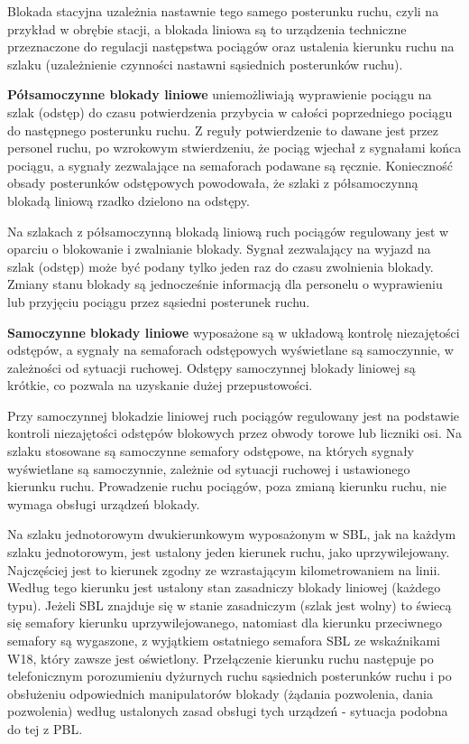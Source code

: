 Blokada stacyjna uzależnia nastawnie tego samego posterunku ruchu, czyli na przykład w obrębie stacji, a blokada liniowa są to urządzenia techniczne przeznaczone do regulacji następstwa pociągów oraz ustalenia kierunku ruchu na szlaku (uzależnienie czynności nastawni sąsiednich posterunków ruchu). 

\textbf{Półsamoczynne blokady liniowe} uniemożliwiają wyprawienie pociągu na szlak (odstęp) do czasu potwierdzenia przybycia w całości poprzedniego pociągu do następnego posterunku ruchu. Z reguły potwierdzenie to dawane jest przez personel ruchu, po wzrokowym stwierdzeniu, że pociąg wjechał z sygnałami końca pociągu, a sygnały zezwalające na semaforach podawane są ręcznie. Konieczność obsady posterunków odstępowych powodowała, że szlaki z półsamoczynną blokadą liniową rzadko dzielono na odstępy.

Na szlakach z półsamoczynną blokadą liniową ruch pociągów regulowany jest w oparciu o blokowanie i zwalnianie blokady. Sygnał zezwalający na wyjazd na szlak (odstęp) może być podany tylko jeden raz do czasu zwolnienia blokady. Zmiany stanu blokady są jednocześnie informacją dla personelu o wyprawieniu lub przyjęciu pociągu przez sąsiedni posterunek ruchu.

\textbf{Samoczynne blokady liniowe} wyposażone są w układową kontrolę niezajętości odstępów, a sygnały na semaforach odstępowych wyświetlane są samoczynnie, w zależności od sytuacji ruchowej. Odstępy samoczynnej blokady liniowej są krótkie, co pozwala na uzyskanie dużej przepustowości.

Przy samoczynnej blokadzie liniowej ruch pociągów regulowany jest na podstawie kontroli niezajętości odstępów blokowych przez obwody torowe lub liczniki osi. Na szlaku stosowane są samoczynne semafory odstępowe, na których sygnały wyświetlane są samoczynnie, zależnie od sytuacji ruchowej i ustawionego kierunku ruchu. Prowadzenie ruchu pociągów, poza zmianą kierunku ruchu, nie wymaga obsługi urządzeń blokady.

Na szlaku jednotorowym dwukierunkowym wyposażonym w SBL, jak na każdym szlaku jednotorowym, jest ustalony jeden kierunek ruchu, jako uprzywilejowany. Najczęściej jest to kierunek zgodny ze wzrastającym kilometrowaniem na linii. Według tego kierunku jest ustalony stan zasadniczy blokady liniowej (każdego typu). 
Jeżeli SBL znajduje się w stanie zasadniczym (szlak jest wolny) to świecą się semafory kierunku uprzywilejowanego, natomiast dla kierunku przeciwnego semafory są wygaszone, z wyjątkiem ostatniego semafora SBL ze wskaźnikami W18, który zawsze jest oświetlony. 
Przełączenie kierunku ruchu następuje po telefonicznym porozumieniu dyżurnych ruchu sąsiednich posterunków ruchu i po obsłużeniu odpowiednich manipulatorów blokady (żądania pozwolenia, dania pozwolenia) według ustalonych zasad obsługi tych urządzeń - sytuacja podobna do tej z PBL. 

